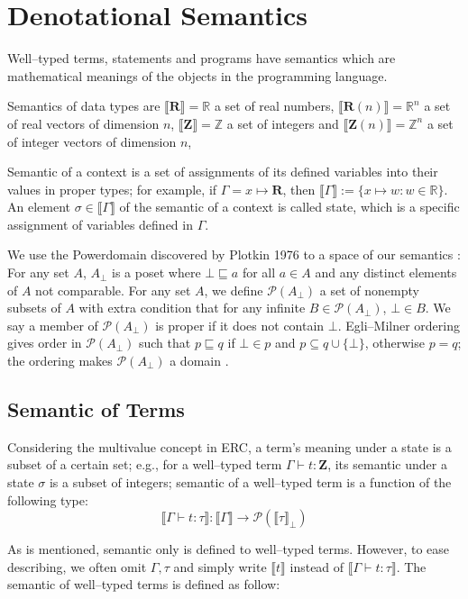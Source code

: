\documentclass{article}
\newcommand{\dreal}{\textbf{R}}
\newcommand{\dint}{\textbf{Z}}
\newcommand{\sem}[1]{\llbracket #1 \rrbracket }
\begin{document}
\section{Denotational Semantics}
\label{s:semantics}

Well--typed terms, statements and programs have semantics which are
mathematical meanings of the objects in the programming language.

Semantics of data types are 
$\sem{\dreal}=\mathbb{R}$ a set of real numbers, 
$\sem{\dreal(n)} = \mathbb{R}^n$ a set of real vectors of dimension $n$,
$\sem{\dint} = \mathbb{Z}$ a set of integers and
$\sem{\dint(n)} = \mathbb{Z}^n$ a set of integer vectors of dimension $n$,

Semantic of a context is a set of assignments of its defined variables 
into their values in proper types;
for example, if $\Gamma = x\mapsto\dreal$, then $\sem{\Gamma} := \{x\mapsto w : w\in \mathbb{R}\}$.
An element $\sigma\in\sem{\Gamma}$ of the semantic of a context is called state, 
which is a specific assignment of variables defined in $\Gamma$.

We use the Powerdomain discovered by Plotkin 1976 to a space of our semantics \cite{Plotkin1976}:
For any set $A$, $A_\bot$ is a poset where $\bot \sqsubseteq a$ for all $a\in A$ and any distinct
elements of $A$ not comparable.
 For any set $A$, we define $\mathcal{P}(A_\bot)$  a set of nonempty subsets of $A$ 
with extra condition that for any infinite $B \in \mathcal{P}(A_\bot)$, $\bot\in B$.
We say a member of $\mathcal{P}(A_\bot)$ is proper if it does not contain $\bot$.
Egli--Milner ordering gives order in $\mathcal{P}(A_\bot)$ such that
$p \sqsubseteq q$ if $\bot\in p$ and $p\subseteq q\cup\{\bot\}$, otherwise $p=q$; the
ordering makes $\mathcal{P}(A_\bot)$ a domain .

\subsection{Semantic of Terms}
Considering the multivalue concept in ERC, a term's meaning under a state is a subset of a certain set;
e.g., for a well--typed term $\Gamma\vdash t : \dint$, its semantic under a state $\sigma$ is a subset
of integers;
semantic of a well--typed term is a function of the following type: 
\[\sem{\Gamma\vdash t : \tau} : \sem{\Gamma} \to \mathcal{P}(\sem{\tau}_\bot)\]

As is mentioned, semantic only is defined to well--typed terms. 
However, to ease describing, we often omit $\Gamma, \tau$ and 
simply write $\sem{t}$ instead of $\sem{\Gamma\vdash t:\tau}$.
The semantic of well--typed terms is defined as follow:
\end{document}
